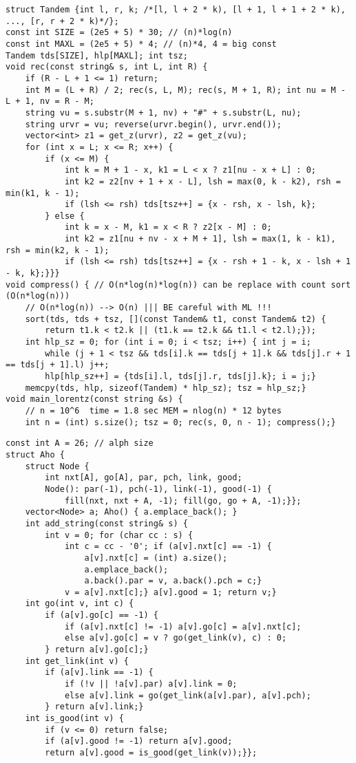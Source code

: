 \documentclass[12pt]{article}
\begin{document}
\begin{verbatim}
struct Tandem {int l, r, k; /*[l, l + 2 * k), [l + 1, l + 1 + 2 * k), ..., [r, r + 2 * k)*/};
const int SIZE = (2e5 + 5) * 30; // (n)*log(n)
const int MAXL = (2e5 + 5) * 4; // (n)*4, 4 = big const
Tandem tds[SIZE], hlp[MAXL]; int tsz;
void rec(const string& s, int L, int R) {
    if (R - L + 1 <= 1) return;
    int M = (L + R) / 2; rec(s, L, M); rec(s, M + 1, R); int nu = M - L + 1, nv = R - M;
    string vu = s.substr(M + 1, nv) + "#" + s.substr(L, nu);
    string urvr = vu; reverse(urvr.begin(), urvr.end());
    vector<int> z1 = get_z(urvr), z2 = get_z(vu);
    for (int x = L; x <= R; x++) {
        if (x <= M) {
            int k = M + 1 - x, k1 = L < x ? z1[nu - x + L] : 0;
            int k2 = z2[nv + 1 + x - L], lsh = max(0, k - k2), rsh = min(k1, k - 1);
            if (lsh <= rsh) tds[tsz++] = {x - rsh, x - lsh, k};
        } else {
            int k = x - M, k1 = x < R ? z2[x - M] : 0;
            int k2 = z1[nu + nv - x + M + 1], lsh = max(1, k - k1), rsh = min(k2, k - 1);
            if (lsh <= rsh) tds[tsz++] = {x - rsh + 1 - k, x - lsh + 1 - k, k};}}}
void compress() { // O(n*log(n)*log(n)) can be replace with count sort (O(n*log(n)))
    // O(n*log(n)) --> O(n) ||| BE careful with ML !!!
    sort(tds, tds + tsz, [](const Tandem& t1, const Tandem& t2) {
        return t1.k < t2.k || (t1.k == t2.k && t1.l < t2.l);});
    int hlp_sz = 0; for (int i = 0; i < tsz; i++) { int j = i; 
        while (j + 1 < tsz && tds[i].k == tds[j + 1].k && tds[j].r + 1 == tds[j + 1].l) j++;
        hlp[hlp_sz++] = {tds[i].l, tds[j].r, tds[j].k}; i = j;}
    memcpy(tds, hlp, sizeof(Tandem) * hlp_sz); tsz = hlp_sz;}
void main_lorentz(const string &s) {
    // n = 10^6  time = 1.8 sec MEM = nlog(n) * 12 bytes
    int n = (int) s.size(); tsz = 0; rec(s, 0, n - 1); compress();}
\end{verbatim}


\begin{verbatim}
const int A = 26; // alph size
struct Aho {
    struct Node {
        int nxt[A], go[A], par, pch, link, good;
        Node(): par(-1), pch(-1), link(-1), good(-1) {
            fill(nxt, nxt + A, -1); fill(go, go + A, -1);}};
    vector<Node> a; Aho() { a.emplace_back(); }
    int add_string(const string& s) {
        int v = 0; for (char cc : s) {
            int c = cc - '0'; if (a[v].nxt[c] == -1) {
                a[v].nxt[c] = (int) a.size();
                a.emplace_back();
                a.back().par = v, a.back().pch = c;}
            v = a[v].nxt[c];} a[v].good = 1; return v;}
    int go(int v, int c) {
        if (a[v].go[c] == -1) {
            if (a[v].nxt[c] != -1) a[v].go[c] = a[v].nxt[c];
            else a[v].go[c] = v ? go(get_link(v), c) : 0;
        } return a[v].go[c];}
    int get_link(int v) {
        if (a[v].link == -1) {
            if (!v || !a[v].par) a[v].link = 0;
            else a[v].link = go(get_link(a[v].par), a[v].pch);
        } return a[v].link;}
    int is_good(int v) {
        if (v <= 0) return false;
        if (a[v].good != -1) return a[v].good;
        return a[v].good = is_good(get_link(v));}};
\end{verbatim}
\end{document}
